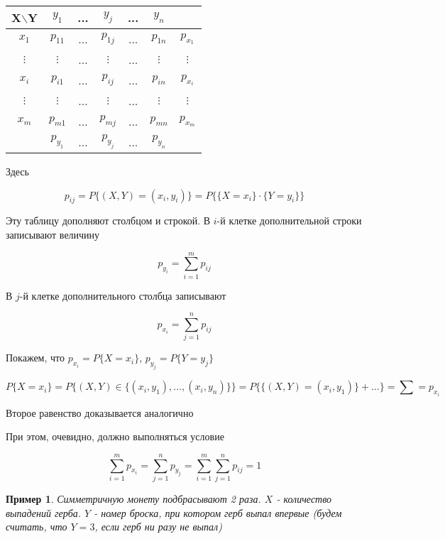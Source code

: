 \documentclass[a4paper, 14pt]{report}
\newtheorem{example}{Пример}[section]
\begin{document}
\begin{table}[H]
    \centering
    \begin{tabular}{|c||c|c|c|c|c||c|}
        \hline
        X$\backslash$Y & $y_1$ & ... & $y_j$ & ... & $y_n$ & \\
        \hline
        \hline
        $x_1$ & $p_{11}$ & ... & $p_{1j}$ & ... & $p_{1n}$ & $p_{x_1}$\\
        \hline
        $\vdots$ & $\vdots$ & ... & $\vdots$ & ... & $\vdots$ & $\vdots$ \\
        \hline
        $x_i$ & $p_{i1}$ & ... & $p_{ij}$ & ... & $p_{in}$ & $p_{x_i}$ \\
        \hline
        $\vdots$ & $\vdots$ & ... & $\vdots$ & ... & $\vdots$ & $\vdots$ \\
        \hline
        $x_m$ & $p_{m1}$ & ... & $p_{mj}$ & ... & $p_{mn}$ & $p_{x_m}$ \\
        \hline
        \hline
         & $p_{y_1}$ & ... & $p_{y_j}$ & ... & $p_{y_n}$ & \\
        \hline
    \end{tabular}
\end{table}

Здесь

$$
p_{ij} = P\{(X,Y) = (x_i, y_i)\} = P\{\{ X = x_i \} \cdot \{Y = y_i\}\}
$$

Эту таблицу дополняют столбцом и строкой. В $i$-й клетке дополнительной строки записывают величину

$$
p_{y_i} = \sum_{i=1}^m p_{ij}
$$

В $j$-й клетке дополнительного столбца записывают

$$
p_{x_i} = \sum_{j=1}^n p_{ij}
$$

Покажем, что $p_{x_i} = P\{X = x_i\}$, $p_{y_j} = P\{ Y = y_j \}$

$$
P\{ X=x_i \} = P\{ (X,Y) \in \{ (x_i, y_1), ..., (x_i, y_n) \} \} = 
P\{ \{(X,Y) = (x_i, y_1)\} + ... \} = \sum = p_{x_i}
$$

Второе равенство доказывается аналогично

При этом, очевидно, должно выполняться условие

$$
\sum_{i=1}^m p_{x_i} = \sum_{j=1}^n p_{y_j} = \sum_{i=1}^m \sum_{j=1}^n p_{ij} = 1
$$

\begin{example}
    Симметричную монету подбрасывают 2 раза. $X$ - количество выпадений герба. $Y$ - номер броска, при котором герб выпал впервые (будем считать, что $Y=3$, если герб ни разу не выпал)
\end{example}
\end{document}
